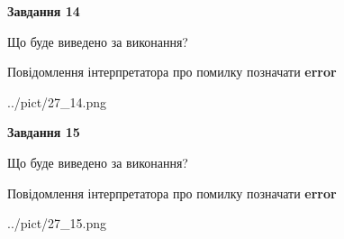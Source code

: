 \documentclass[11pt, ukrainian]{article}
\begin{document}
{\begin {large}
{\begin {center}\textbf{Завдання 14}\end {center}}\par
Що буде виведено за виконання? \par
Повідомлення інтерпретатора про помилку позначати \textbf{error}

\begin{center}
	{../pict/27_14.png}
\end{center}
\newpage

{\begin {center}\textbf{Завдання 15}\end {center}}\par
Що буде виведено за виконання? \par
Повідомлення інтерпретатора про помилку позначати \textbf{error}

\begin{center}
	{../pict/27_15.png}
\end{center}
\newpage

\end {large}}
\end{document}

